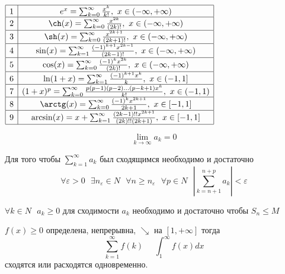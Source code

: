 \documentclass{article}
\begin{document}
\begin{turn}{90}
$
\begin{array}{|c|c|}

  \hline
  1&e^x = \sum_{k=0}^{\infty} \frac{x^k}{k!}, ~ x \in (-\infty, +\infty) \\
  \hline
  2&\ch(x) = \sum_{k=0}^{\infty} \frac{x^{2k}}{(2k)!},
  ~ x \in (-\infty, +\infty)\\
  \hline
  3&\sh(x) = \sum_{k=0}^{\infty} \frac{x^{2k + 1}}{(2k +1)!},
  ~ x \in (-\infty, +\infty)\\
  \hline
  4&\sin(x) = \sum_{k=1}^{\infty} \frac{(-1)^{k+1} x^{2k-1}}{(2k-1)!},
  ~ x \in (-\infty, +\infty)\\
  \hline
  5&\cos(x) = \sum_{k=0}^{\infty} \frac{(-1)^k x^{2k}}{(2k)!},
  ~ x \in (-\infty, +\infty)\\
  \hline
  6&\ln(1 + x) = \sum_{k=1}^{\infty} \frac{(-1)^{k+1} x^k}{k}, ~ x \in (-1, 1]\\
  \hline
  7&(1 + x)^p = \sum_{k=0}^{\infty} \frac{p(p-1)(p-2)\ldots(p-k+1) x^k}{k!},
  ~ x \in (-1,1)\\
  \hline
  8&\arctg(x) = \sum_{k=0}^{\infty} \frac{(-1)^k x^{2k+1}}{2k + 1},
  ~ x \in [-1,1]\\
  \hline
  9&\arcsin(x) = x + \sum_{k=1}^{\infty}
  \frac{(2k - 1)!! x^{2k+1}}{(2k)!! (2k+1)}, ~ x \in [-1,1]\\
  \hline

\end{array}
$
\end{turn}

\begin{block}
  $$
  \lim_{k \to \infty} a_k = 0
  $$
\end{block}

\begin{block}
  Для того чтобы $\sum_{k=1}^{\infty} a_k$ был сходящимся необходимо и
  достаточно
  $$
  \forall \varepsilon > 0 ~~~
  \exists n_{\varepsilon} \in N ~~~
  \forall n \ge n_{\varepsilon} ~~~
  \forall p \in N ~~~
  \left| \sum_{k=n+1}^{n+p} a_k \right| < \varepsilon
  $$
\end{block}

\begin{block}[Критерий]
  $
  \forall k \in N ~~~
  a_k \ge 0
  $
  для сходимости $a_k$ необходимо и достаточно чтобы $S_n \le M$
\end{block}

\begin{block}
  $f(x) \ge 0$ определена, непрерывна, $\searrow$ на $[1, +\infty]$ тогда
  $$
  \sum_{k=1}^{\infty} f(k) ~~~~~~ \int_1^{\infty} f(x)dx
  $$
  сходятся или расходятся одновременно.
\end{block}
\end{document}
